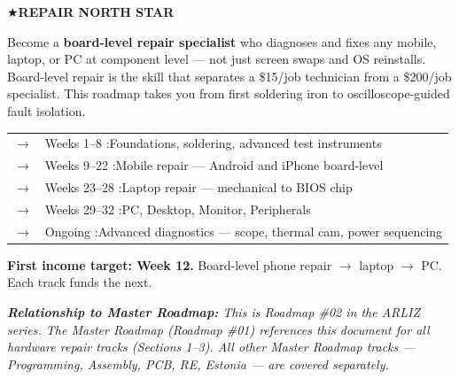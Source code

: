 \label{sec:repairnorthstar}
\vspace{0.4cm}
\begin{northstarbox}
\textbf{\color{arlizblue}\large $\bigstar$\enspace REPAIR NORTH STAR}

\vspace{6pt}
Become a \textbf{board-level repair specialist} who diagnoses and fixes any mobile, laptop,
or PC at component level --- not just screen swaps and OS reinstalls.
Board-level repair is the skill that separates a \$15/job technician from a \$200/job specialist.
This roadmap takes you from first soldering iron to oscilloscope-guided fault isolation.

\vspace{8pt}
\begin{tabular}{@{\hspace{4pt}}ll}
  \textbf{\color{arlizblue}$\to$} & Weeks 1--8\phantom{0} :\enspace Foundations, soldering, advanced test instruments \\
  \textbf{\color{arlizblue}$\to$} & Weeks 9--22  :\enspace Mobile repair --- Android and iPhone board-level \\
  \textbf{\color{arlizblue}$\to$} & Weeks 23--28 :\enspace Laptop repair --- mechanical to BIOS chip \\
  \textbf{\color{arlizblue}$\to$} & Weeks 29--32 :\enspace PC, Desktop, Monitor, Peripherals \\
  \textbf{\color{arlizblue}$\to$} & Ongoing\phantom{000} :\enspace Advanced diagnostics --- scope, thermal cam, power sequencing \\
\end{tabular}

\vspace{8pt}
\textbf{\color{arlizgold}First income target: Week 12.}
Board-level phone repair $\to$ laptop $\to$ PC. Each track funds the next.
\end{northstarbox}

\vspace{0.5cm}
\noindent
\begin{tcolorbox}[
  enhanced, colback=bgsubtle, colframe=arlizblue!30,
  leftrule=4pt, sharp corners, left=10pt, right=10pt, top=6pt, bottom=6pt
]
{\small\color{arligray}\itshape
\textbf{\color{arliznavy}Relationship to Master Roadmap:}
This is Roadmap \#02 in the ARLIZ series. The Master Roadmap (Roadmap \#01) references
this document for all hardware repair tracks (Sections 1--3).
All other Master Roadmap tracks --- Programming, Assembly, PCB, RE, Estonia --- are covered separately.
}
\end{tcolorbox}
